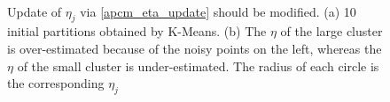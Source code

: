 \documentclass[conference]{IEEEtran}
\theoremstyle{definition}
\begin{document}
\begin{figure}[tb]
\captionsetup[subfloat]{farskip=1pt,captionskip=1pt}%
   \centering
    \\
\caption{Update of $\eta_j$ via \eqref{apcm_eta_update} should be modified. (a) 10 initial partitions obtained by K-Means. (b) The $\eta$ of the large cluster is over-estimated because of the noisy points on the left, whereas the $\eta$ of the small cluster is under-estimated. The radius of each circle is the corresponding $\eta_j$}
\label{fig_eta}
\end{figure}
\end{document}
